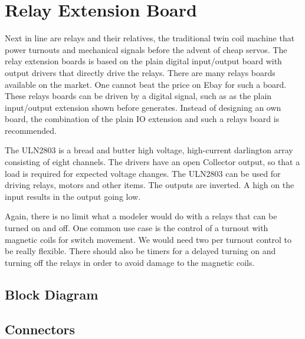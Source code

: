 \chapter{Relay Extension Board}

Next in line are relays and their relatives, the traditional twin coil machine that power turnouts and mechanical signals before the advent of cheap servos. The relay extension boards is based on the plain digital input/output board with output drivers that directly drive the relays. There are many relays boards available on the market. One cannot beat the price on Ebay for such a board. These relays boards can be driven by a digital signal, such as as the plain input/output extension shown before generates. Instead of designing an own board, the combination of the plain IO extension and such a relays board is recommended.

The ULN2803 is a bread and butter high voltage, high-current darlington array consisting of eight channels. The drivers have an open Collector output, so that a load is required for expected voltage changes. The ULN2803 can be used for driving relays, motors and other items. The outputs are inverted. A high on the input results in the output going low.


Again, there is no limit what a modeler would do with a relays that can be turned on and off. One common use case is the control of a turnout with magnetic coils for switch movement. We would need two per turnout control to be really flexible. There should also be timers for a delayed turning on and turning off the relays in order to avoid damage to the magnetic coils.

\section{Block Diagram}


\section{Connectors}


